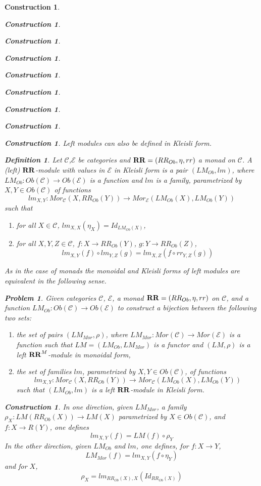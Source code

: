 \documentclass[12pt]{amsart}
\newenvironment{eq}{\begin{equation}}{\end{equation}}
\newtheorem{definition}[proposition]{Definition}
\newtheorem{problem}[proposition]{Problem}
\newtheorem{construction}[proposition]{Construction}
\newcommand{\llabel}[1]{\label{#1}}
\newcommand{\sr}{\rightarrow}
\newcommand{\RR}{{\bf RR}}
\newcommand{\C}{{\mathcal C}}
\newcommand{\E}{{\mathcal E}}
\begin{document}
\begin{construction}
\begin{construction}
\begin{construction}
\begin{construction}
\begin{construction}
\begin{construction}
\begin{construction}
\begin{construction}
\begin{construction}
Left modules can also be defined in Kleisli form. 
%
\begin{definition}
\llabel{2017.04.15.def1} 
Let $\C$,$\E$ be categories and
$\RR=(RR_{Ob},\eta,rr)$ a monad on $\C$. A (left) $\RR$-module with values in
$\E$ in Kleisli form is a pair $(LM_{Ob},lm)$, where $LM_{Ob}:Ob(\C)\sr
Ob(\E)$ is a function and $lm$ is a family, parametrized by $X,Y\in Ob(\C)$ of
functions
%
$$lm_{X,Y}:Mor_{\C}(X,RR_{Ob}(Y))\sr Mor_{\E}(LM_{Ob}(X),LM_{Ob}(Y))$$
%
such that
%
\begin{enumerate}
\item for all $X\in\C$, $lm_{X,X}(\eta_X)=Id_{LM_{Ob}(X)}$,
\item for all $X,Y,Z\in\C$, $f:X\sr RR_{Ob}(Y)$, $g:Y\sr RR_{Ob}(Z)$, 
%
$$lm_{X,Y}(f)\circ lm_{Y,Z}(g)=lm_{X,Z}(f\circ rr_{Y,Z}(g))$$
\end{enumerate}
\end{definition}
%
As in the case of monads the monoidal and Kleisli forms of left modules are
equivalent in the following sense.
%
\begin{problem}
\llabel{2017.04.03.prob1} 
Given categories $\C$, $\E$, a monad
$\RR=(RR_{Ob},\eta,rr)$ on $\C$, and a function $LM_{Ob}:Ob(\C)\sr Ob(\E)$ to
construct a bijection between the following two sets:
%
\begin{enumerate}
\item the set of pairs $(LM_{Mor},\rho)$, where $LM_{Mor}:Mor(\C)\sr Mor(\E)$ is
  a function such that $LM=(LM_{Ob},LM_{Mor})$ is a functor and $(LM,\rho)$ is
  a left $\RR^M$-module in monoidal form,
\item the set of families $lm$, parametrized by $X,Y\in Ob(\C)$, of functions
%
$$lm_{X,Y}:Mor_{\C}(X,RR_{Ob}(Y))\sr Mor_{\C}(LM_{Ob}(X),LM_{Ob}(Y))$$
%
such that $(LM_{Ob},lm)$ is a left $\RR$-module in Kleisli form. 
\end{enumerate}
\end{problem}
%
\begin{construction}\rm\llabel{2017.04.03.constr1}
In one direction, given $LM_{Mor}$, a family $\rho_X:LM(RR_{Ob}(X))\sr LM(X)$
parametrized by $X\in Ob(\C)$, and $f:X\sr R(Y)$, one defines
%
\begin{eq}\llabel{2017.04.09.eq4}
lm_{X,Y}(f)=LM(f)\circ \rho_Y
\end{eq}%
%
In the other direction, given $LM_{Ob}$ and $lm$, one defines, for $f:X\sr Y$, 
%
\begin{eq}\llabel{2017.04.09.eq3}
LM_{Mor}(f)=lm_{X,Y}(f\circ \eta_Y)
\end{eq}%
%
and for $X$, 
%
$$\rho_X=lm_{RR_{Ob}(X),X}(Id_{RR_{Ob}(X)})$$


\end{construction}
\end{construction}
\end{construction}
\end{construction}
\end{construction}
\end{construction}
\end{construction}
\end{construction}
\end{construction}
\end{construction}
\end{document}
